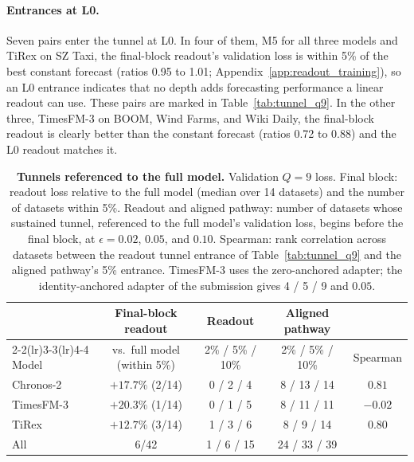 \paragraph{Entrances at L0.} Seven pairs enter the tunnel at L0. In four of them, M5 for all three models and TiRex on SZ Taxi, the final-block readout's validation loss is within 5\% of the best constant forecast (ratios 0.95 to 1.01; Appendix~\ref{app:readout_training}), so an L0 entrance indicates that no depth adds forecasting performance a linear readout can use. These pairs are marked in Table~\ref{tab:tunnel_q9}. In the other three, TimesFM-3 on BOOM, Wind Farms, and Wiki Daily, the final-block readout is clearly better than the constant forecast (ratios 0.72 to 0.88) and the L0 readout matches it.

\begin{table}[t]
\centering
\caption{\textbf{Tunnels referenced to the full model.} Validation $Q=9$ loss. Final block: readout loss relative to the full model (median over 14 datasets) and the number of datasets within 5\%. Readout and aligned pathway: number of datasets whose sustained tunnel, referenced to the full model's validation loss, begins before the final block, at $\epsilon=0.02$, $0.05$, and $0.10$. Spearman: rank correlation across datasets between the readout tunnel entrance of Table~\ref{tab:tunnel_q9} and the aligned pathway's 5\% entrance. TimesFM-3 uses the zero-anchored adapter; the identity-anchored adapter of the submission gives 4 / 5 / 9 and $0.05$.}
\vspace{4pt}
\label{tab:native_reference}
\small
\setlength{\tabcolsep}{4pt}
\begin{tabular}{@{}lcccc@{}}
\toprule
& \multicolumn{1}{c}{Final-block readout} & \multicolumn{1}{c}{Readout} & \multicolumn{1}{c}{Aligned pathway} & \\
\cmidrule(lr){2-2}\cmidrule(lr){3-3}\cmidrule(lr){4-4}
Model & vs.\ full model (within 5\%) & 2\% / 5\% / 10\% & 2\% / 5\% / 10\% & Spearman \\
\midrule
Chronos-2 & $+17.7\%$ (2/14) & 0 / 2 / 4 & 8 / 13 / 14 & $0.81$ \\
TimesFM-3 & $+20.3\%$ (1/14) & 0 / 1 / 5 & 8 / 11 / 11 & $-0.02$ \\
TiRex & $+12.7\%$ (3/14) & 1 / 3 / 6 & 8 / 9 / 14 & $0.80$ \\
\midrule
All & 6/42 & 1 / 6 / 15 & 24 / 33 / 39 & \\
\bottomrule
\end{tabular}
\end{table}
